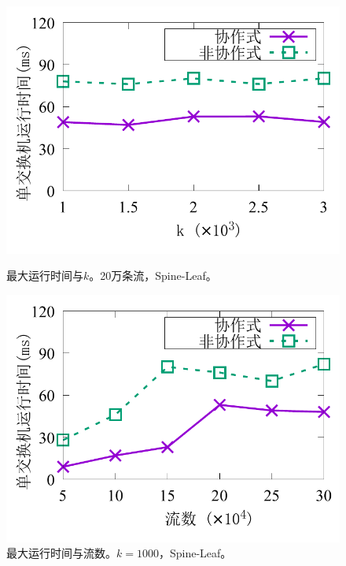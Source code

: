 \begin{figure}[ht]
	\centering
	\begin{minipage}[t]{0.48\linewidth}		
		\centering
		\includegraphics[width=\linewidth]{fig/half_eg_time_k.pdf}
		\caption{\textnormal{最大运行时间与$k$。20万条流，Spine-Leaf。}}
		\label{fig:coop,time,k}
	\end{minipage}\vspace{-0.6em}\hspace{0.4em}
	\begin{minipage}[t]{0.48\linewidth}
		\centering
		\includegraphics[width=\linewidth]{fig/half_eg_time_flow.pdf}
		\caption{\textnormal{最大运行时间与流数。$k=1000$，Spine-Leaf。}}
		\label{fig:coop,time,flow}
	\end{minipage}\vspace{-0.6em}
\end{figure}

